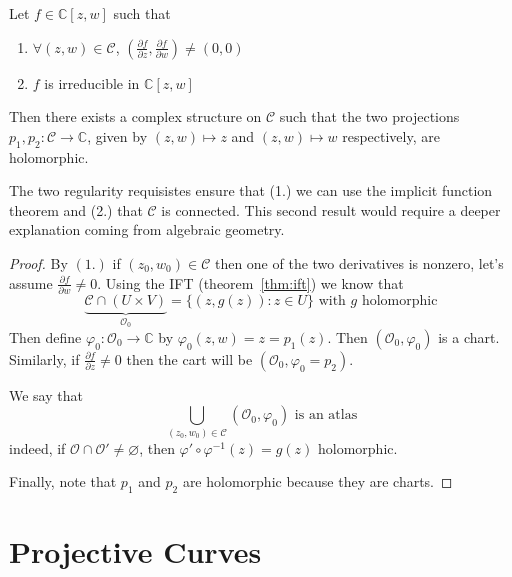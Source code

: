 \begin{theorem}{}
    Let \(f \in \mathbb{C}[z,w]\) such that 
\begin{enumerate}[label = \arabic*.]
    \item \(\forall {(z, w)} \in \mathcal{C}\), \({\left( \frac{\partial
        f}{\partial z}, \frac{\partial f}{\partial w} \right)}\neq {(0, 0)}  \) 
    \item \(f\) is irreducible in \(\mathbb{C}[z,w]\) 
\end{enumerate}
Then there exists a complex structure on \(\mathcal{C}\) such that the two
projections \(p_{1}, p_{2} : \mathcal{C} \to \mathbb{C}\), given by \({(z, w)}
\mapsto z\) and \({(z, w)} \mapsto w\) respectively, are holomorphic.

\end{theorem}

\begin{remark}{}
    The two regularity requisistes ensure that (1.) we can use the implicit
    function theorem and (2.) that \(\mathcal{C}\) is connected. This second
    result would require a deeper explanation coming from algebraic geometry.
\end{remark}

\begin{proof}{}
    By \({(1.)}\) if \({(z_{0}, w_{0})} \in \mathcal{C}\) then one of the two
    derivatives is nonzero, let's assume \(\frac{\partial f}{\partial w} \neq
    0\). Using the IFT (theorem~\ref{thm:ift}) we know that 
    \[
        \underbrace{\mathcal{C} \cap {(U \times  V)}}_{\mathcal{O}_0}  = \{{(z, g{(z)})} : z \in U\} \text{ with
      \(g\) holomorphic}
    \]
    Then define \(\varphi_{0} : \mathcal{O}_0 \to \mathbb{C}\) by
    \(\varphi_{0}{(z, w)} = z = p_{1}{(z)}\). Then \({(\mathcal{O}_0,
    \varphi_{0})}\) is a chart. Similarly, if \(\frac{\partial f}{\partial z}
    \neq 0\) then the cart will be \({(\mathcal{O}_0, \varphi_{0} = p_{2})}\).

    We say that
    \[
      \bigcup_{{(z_{0}, w_{0})} \in  \mathcal{C}} {(\mathcal{O}_0, \varphi_{0})}
      \text{ is an atlas}
    \]
    indeed, if \(\mathcal{O} \cap \mathcal{O}' \neq \varnothing\), then
    \(\varphi' \circ \varphi ^{-1}{(z)} = g{(z)}\) holomorphic. %

    Finally, note that \(p_{1}\) and \(p_{2}\) are holomorphic because they are
    charts.
\end{proof}

\section{Projective Curves}

